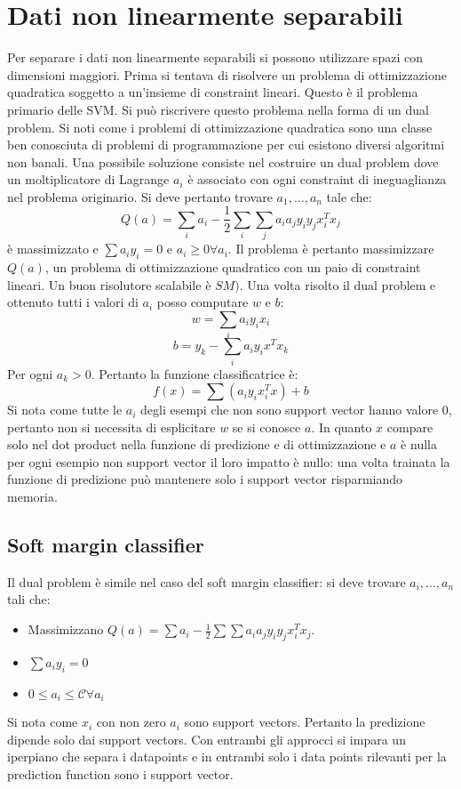 \section{Dati non linearmente separabili}
Per separare i dati non linearmente separabili si possono utilizzare spazi con dimensioni maggiori.
Prima si tentava di risolvere un problema di ottimizzazione quadratica soggetto a un'insieme di constraint lineari.
Questo \`e il problema primario delle SVM.
Si pu\`o riscrivere questo problema nella forma di un dual problem.
Si noti come i problemi di ottimizzazione quadratica sono una classe ben conosciuta di problemi di programmazione per cui esistono diversi algoritmi non banali.
Una possibile soluzione consiste nel costruire un dual problem dove un moltiplicatore di Lagrange $a_i$ \`e associato con ogni constraint di ineguaglianza nel problema originario.
Si deve pertanto trovare $a_1,\dots,a_n$ tale che:
$$Q(a) = \sum_i a_i - \frac{1}{2}\sum_i\sum_j a_ia_jy_iy_jx_i^Tx_j$$
\`e massimizzato e $\sum a_iy_i = 0$ e $a_i\ge 0\forall a_i$.
Il problema \`e pertanto massimizzare $Q(a)$, un problema di ottimizzazione quadratico con un paio di constraint lineari.
Un buon risolutore scalabile \`e $SM)$.
Una volta risolto il dual problem e ottenuto tutti i valori di $a_i$ posso computare $w$ e $b$:
$$w=\sum_i a_iy_ix_i$$
$$b = y_k - \sum_i a_iy_ix^Tx_k$$
Per ogni $a_k>0$.
Pertanto la funzione classificatrice \`e:
$$f(x) = \sum(a_iy_ix_i^Tx)+b$$
Si nota come tutte le $a_i$ degli esempi che non sono support vector hanno valore $0$, pertanto non si necessita di esplicitare $w$ se si conosce $a$.
In quanto $x$ compare solo nel dot product nella funzione di predizione e di ottimizzazione e $a$ \`e nulla per ogni esempio non support vector il loro impatto \`e nullo: una volta trainata la funzione di predizione pu\`o mantenere solo i support vector risparmiando memoria.

	\subsection{Soft margin classifier}
	Il dual problem \`e simile nel caso del soft margin classifier: si deve trovare $a_i,\dots, a_n$ tali che:
	\begin{itemize}
		\item Massimizzano $Q(a) = \sum a_i-\frac{1}{2}\sum\sum a_ia_jy_iy_jx_i^Tx_j$.
		\item $\sum a_iy_i = 0$
		\item $0\le a_i\le \mathcal{C}\forall a_i$
	\end{itemize}
	Si nota come $x_i$ con non zero $a_i$ sono support vectors.
	Pertanto la predizione dipende solo dai support vectors.
	Con entrambi gli approcci si impara un iperpiano che separa i datapoints e in entrambi solo i data points rilevanti per la prediction function sono i support vector.
	
